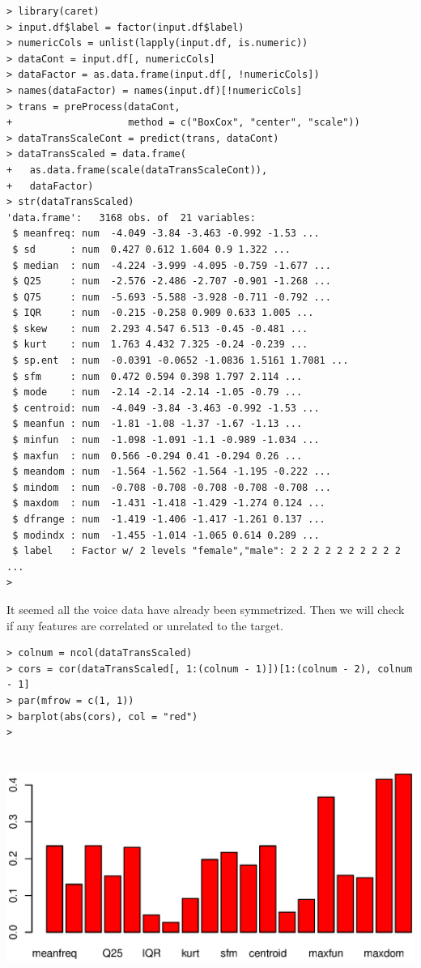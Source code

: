 \documentclass{article}%
\begin{document}
\begin{verbatim}
> library(caret)
> input.df$label = factor(input.df$label)
> numericCols = unlist(lapply(input.df, is.numeric))
> dataCont = input.df[, numericCols]
> dataFactor = as.data.frame(input.df[, !numericCols])
> names(dataFactor) = names(input.df)[!numericCols]
> trans = preProcess(dataCont,
+                    method = c("BoxCox", "center", "scale"))
> dataTransScaleCont = predict(trans, dataCont)
> dataTransScaled = data.frame(
+   as.data.frame(scale(dataTransScaleCont)),
+   dataFactor)
> str(dataTransScaled)
'data.frame':	3168 obs. of  21 variables:
 $ meanfreq: num  -4.049 -3.84 -3.463 -0.992 -1.53 ...
 $ sd      : num  0.427 0.612 1.604 0.9 1.322 ...
 $ median  : num  -4.224 -3.999 -4.095 -0.759 -1.677 ...
 $ Q25     : num  -2.576 -2.486 -2.707 -0.901 -1.268 ...
 $ Q75     : num  -5.693 -5.588 -3.928 -0.711 -0.792 ...
 $ IQR     : num  -0.215 -0.258 0.909 0.633 1.005 ...
 $ skew    : num  2.293 4.547 6.513 -0.45 -0.481 ...
 $ kurt    : num  1.763 4.432 7.325 -0.24 -0.239 ...
 $ sp.ent  : num  -0.0391 -0.0652 -1.0836 1.5161 1.7081 ...
 $ sfm     : num  0.472 0.594 0.398 1.797 2.114 ...
 $ mode    : num  -2.14 -2.14 -2.14 -1.05 -0.79 ...
 $ centroid: num  -4.049 -3.84 -3.463 -0.992 -1.53 ...
 $ meanfun : num  -1.81 -1.08 -1.37 -1.67 -1.13 ...
 $ minfun  : num  -1.098 -1.091 -1.1 -0.989 -1.034 ...
 $ maxfun  : num  0.566 -0.294 0.41 -0.294 0.26 ...
 $ meandom : num  -1.564 -1.562 -1.564 -1.195 -0.222 ...
 $ mindom  : num  -0.708 -0.708 -0.708 -0.708 -0.708 ...
 $ maxdom  : num  -1.431 -1.418 -1.429 -1.274 0.124 ...
 $ dfrange : num  -1.419 -1.406 -1.417 -1.261 0.137 ...
 $ modindx : num  -1.455 -1.014 -1.065 0.614 0.289 ...
 $ label   : Factor w/ 2 levels "female","male": 2 2 2 2 2 2 2 2 2 2 ...
> \end{verbatim}
It seemed all the voice data have already been symmetrized. Then we will check if any features are correlated or unrelated to the target.
\begin{verbatim}
> colnum = ncol(dataTransScaled)
> cors = cor(dataTransScaled[, 1:(colnum - 1)])[1:(colnum - 2), colnum - 1]
> par(mfrow = c(1, 1))
> barplot(abs(cors), col = "red")
> \end{verbatim}
\includegraphics[width=\textwidth, height = 7.5cm]{Rplot_corr_target.eps}
\end{document}
